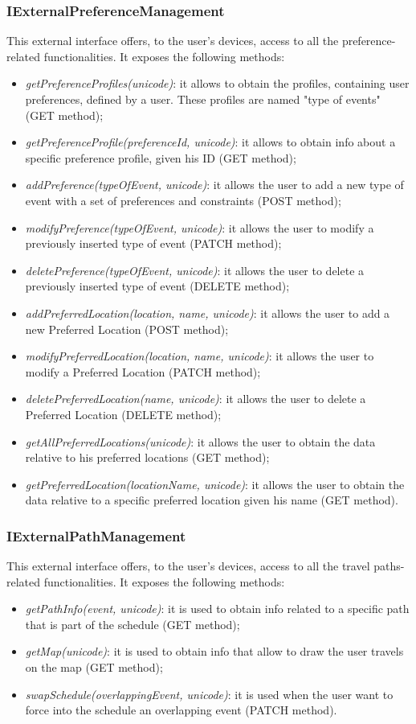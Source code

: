 \subsubsection{IExternalPreferenceManagement}
This external interface offers, to the user's devices, access to all the preference-related functionalities. It exposes the following methods:
\begin{itemize}
\item \textit{getPreferenceProfiles(unicode)}: it allows to obtain the profiles, containing user preferences, defined by a user. These profiles are named "type of events" (GET method);
\item \textit{getPreferenceProfile(preferenceId, unicode)}: it allows to obtain info about a specific preference profile, given his ID (GET method);
\item \textit{addPreference(typeOfEvent, unicode)}: it allows the user to add a new type of event with a set of preferences and constraints (POST method);
\item \textit{modifyPreference(typeOfEvent, unicode)}: it allows the user to modify a previously inserted type of event (PATCH method);
\item \textit{deletePreference(typeOfEvent, unicode)}: it allows the user to delete a previously inserted type of event (DELETE method);
\item \textit{addPreferredLocation(location, name, unicode)}: it allows the user to add a new Preferred Location (POST method);
\item \textit{modifyPreferredLocation(location, name, unicode)}: it allows the user to modify a Preferred Location (PATCH method);
\item \textit{deletePreferredLocation(name, unicode)}: it allows the user to delete a Preferred Location (DELETE method);
\item \textit{getAllPreferredLocations(unicode)}: it allows the user to obtain the data relative to his preferred locations (GET method);
\item \textit{getPreferredLocation(locationName, unicode)}: it allows the user to obtain the data relative to a specific preferred location given his name (GET method).
\end{itemize}
\subsubsection{IExternalPathManagement}
This external interface offers, to the user's devices, access to all the travel paths-related functionalities. It exposes the following methods:
\begin{itemize}
\item \textit{getPathInfo(event, unicode)}: it is used to obtain info related to a specific path that is part of the schedule (GET method);
\item \textit{getMap(unicode)}: it is used to obtain info that allow to draw the user travels on the map (GET method);
\item \textit{swapSchedule(overlappingEvent, unicode)}: it is used when the user want to force into the schedule an overlapping event (PATCH method). 
\end{itemize}

